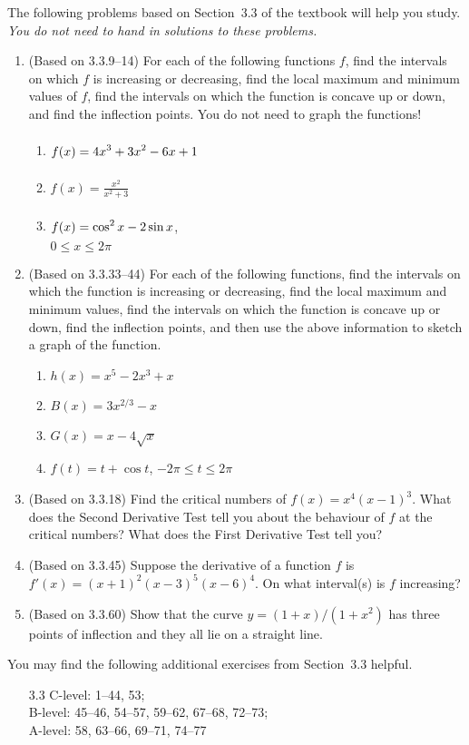 \documentclass{article}
\title{\commonPSTitleZeroThreeThree}
\author{\commonAuthor}
\date{\commonDateZeroThreeThree}
\newcommand{\ds}{\displaystyle}
\begin{document}
\maketitle
\thispagestyle{empty}

\noindent
The following problems based on Section~3.3 of the textbook will help
you study.  \emph{You do not need to hand in solutions to these
  problems.}
\begin{enumerate}
\item (Based on 3.3.9--14) %
  For each of the following functions $f$, find the intervals on which 
  $f$ is increasing or decreasing, find the local maximum and minimum values
  of $f$, find the intervals on which the function is concave up or down,
  and find the inflection points.  You do not need to graph the functions!
  \begin{multicols}{3}
  \begin{enumerate}
  \item $\ds f(x)=4x^3+3x^2-6x+1
  \vphantom{\frac{x^2}{x^2+3}}$
  \item $\ds f(x)=\frac{x^2}{x^2+3}$
  \item $\ds f(x)=\cos^2 x - 2\sin x\vphantom{\frac{x^2}{x^2+3}}$,\\
  $0\le x\le 2\pi$
  \end{enumerate}
  \end{multicols}
\item (Based on 3.3.33--44) %
  For each of the following functions, find the intervals on which the
  function is increasing or decreasing, find the local maximum and
  minimum values, find the intervals on which the function is concave
  up or down, find the inflection points, and then use the above
  information to sketch a graph of the function.
  \begin{multicols}{4}
  \begin{enumerate}
  \item $\ds h(x)=x^5-2x^3+x$
  \item $\ds B(x)=3x^{2/3}-x$
  \item $\ds G(x)=x-4\sqrt{x}$
  \item $\ds f(t)=t+\cos t$, $-2\pi\le t\le 2\pi$
  \end{enumerate}
  \end{multicols}
\item (Based on 3.3.18) %
  Find the critical numbers of $f(x)=x^4(x-1)^3$.
  What does the Second Derivative Test tell you about the
    behaviour of $f$ at the critical numbers?
  What does the First Derivative Test tell you?
\item (Based on 3.3.45) %
  Suppose the derivative of a function $f$ is $f'(x)=(x+1)^2(x-3)^5(x-6)^4$.
  On what interval(s) is $f$ increasing?
\item (Based on 3.3.60) %
  Show that the curve $y=(1+x)/(1+x^2)$ has three points of inflection and
  they all lie on a straight line.
\end{enumerate}

\noindent
You may find the following additional exercises from Section~3.3
helpful.
\begin{itemize}
\item[3.3] 
  C-level: 1--44, 53; \\
  B-level: 45--46, 54--57, 59--62, 67--68, 72--73; \\
  A-level: 58, 63--66, 69--71, 74--77
\end{itemize}
\end{document}
